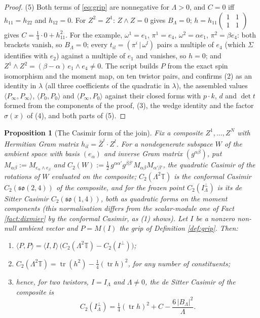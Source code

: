 \documentclass[11pt]{article}
\newtheorem{proposition}[theorem]{Proposition}
\theoremstyle{definition}
\newcommand{\T}{\mathbb{T}}
\newcommand{\tr}{\operatorname{tr}}
\newcommand{\ip}[2]{\langle #1, #2\rangle}
\newcommand{\hp}[2]{( #1 \,|\, #2 )}
\begin{document}
\begin{proof}
(5) Both terms of \eqref{eq:grip} are nonnegative for $\Lambda > 0$, and $C = 0$ iff $h_{11} = h_{22}$ and $h_{12} = 0$. For $Z^{2} = Z^{1}$: $Z\wedge Z = 0$ gives $B_{\Lambda} = 0$; $h = h_{11}\left(\begin{smallmatrix}1&1\\1&1\end{smallmatrix}\right)$ gives $C = \tfrac14\cdot 0 + h_{11}^{2}$. For the example, $\omega^{1} = e_{1}$, $\pi^{1} = e_{4}$, $\omega^{2} = \alpha e_{1}$, $\pi^{2} = \beta e_{4}$: both brackets vanish, so $B_{\Lambda} = 0$; every $t_{il} = \hp{\pi^{i}}{\omega^{l}}$ pairs a multiple of $e_{4}$ (which $\Sigma$ identifies with $e_{2}$) against a multiple of $e_{1}$ and vanishes, so $h = 0$; and $Z^{1}\wedge Z^{2} = (\beta - \alpha)\,e_{1}\wedge e_{4} \neq 0$. The script builds $P$ from the exact spin isomorphism and the moment map, on ten twistor pairs, and confirms (2) as an identity in $\lambda$ (all three coefficients of the quadratic in $\lambda$), the assembled values $\ip{P_{\infty}}{P_{\infty}}$, $\ip{P_{0}}{P_{0}}$ and $\ip{P_{\infty}}{P_{0}}$ against their closed forms with $p\cdot k$, $d$ and $\det t$ formed from the components of the proof, (3), the wedge identity and the factor $\sigma(x)$ of (4), and both parts of (5).
\end{proof}

\begin{proposition}[The Casimir form of the join]\label{prop:casimir}
Fix a composite $Z^{1}, \dots, Z^{N}$ with Hermitian Gram matrix $h_{il} = \bar{Z}^{i}\cdot Z^{l}$. For a nondegenerate subspace $W$ of the ambient space with basis $(e_{\alpha})$ and inverse Gram matrix $(g^{\alpha\beta})$, put $M_{\alpha\beta} := M_{e_{\alpha}\wedge e_{\beta}}$ and $C_{2}(W) := \tfrac12\, g^{\alpha\alpha'}g^{\beta\beta'}M_{\alpha\beta}M_{\alpha'\beta'}$, the quadratic Casimir of the rotations of $W$ evaluated on the composite; $C_{2}(\Lambda^{2}\T)$ is the conformal Casimir $C_{2}(\mathfrak{so}(2,4))$ of the composite, and for the frozen point $C_{2}(I_{\Lambda}^{\perp})$ is its de Sitter Casimir $C_{2}(\mathfrak{so}(1,4))$, both as quadratic forms on the moment components (this normalisation differs from the scalar-module one of Fact \ref{fact:dixmier} by the conformal Casimir, as (1) shows). Let $I$ be a nonzero non-null ambient vector and $P = M(I)$ the grip of Definition \ref{def:grip}. Then:
\begin{enumerate}
\item $\ip{P}{P} = \ip{I}{I}\,\bigl(C_{2}(\Lambda^{2}\T) - C_{2}(I^{\perp})\bigr)$;
\item $C_{2}(\Lambda^{2}\T) = \tr(h^{2}) - \tfrac14(\tr h)^{2}$, for any number of constituents;
\item hence, for two twistors, $I = I_{\Lambda}$ and $\Lambda \neq 0$, the de Sitter Casimir of the composite is
\[
C_{2}(I_{\Lambda}^{\perp}) = \tfrac14(\tr h)^{2} + C - \frac{6\,|B_{\Lambda}|^{2}}{\Lambda}.
\]
\end{enumerate}
\end{proposition}
\end{document}
